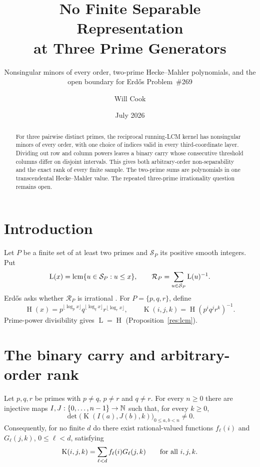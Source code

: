 \documentclass[11pt]{article}
\title{No Finite Separable Representation\\at Three Prime Generators}
\subtitle{Nonsingular minors of every order, two-prime Hecke--Mahler
polynomials, and the open boundary for Erd\H{o}s Problem~\#269}
\author{Will Cook}
\date{July 2026}
\newcommand{\hgt}{\operatorname{H}}
\newcommand{\Lprefix}{\operatorname{L}}
\newcommand{\Kernel}{\operatorname{K}}
\begin{document}
\maketitle
\noteprovenance

\begin{abstract}
For three pairwise distinct primes, the reciprocal running-LCM kernel has
nonsingular minors of every order, with one choice of indices valid in every
third-coordinate layer.  Dividing out row and column powers leaves a binary
carry whose consecutive threshold columns differ on disjoint intervals.
This gives both arbitrary-order non-separability and the exact rank of every
finite sample.  The two-prime sums are polynomials in one transcendental
Hecke--Mahler value.  The repeated three-prime irrationality question remains
open.
\end{abstract}

\section{Introduction}\label{sec:problem}
Let $P$ be a finite set of at least two primes and $\mathcal S_P$ its positive
smooth integers.  Put
\[
 \Lprefix(x)=\lcm\{u\in\mathcal S_P:u\le x\},\qquad
 \mathcal R_P=\sum_{u\in\mathcal S_P}\Lprefix(u)^{-1}.
\]
Erd\H{o}s asks whether $\mathcal R_P$ is irrational
\cite[p.~65]{erdosgraham1980}\cite[p.~106]{erdos1988}.
For $P=\{p,q,r\}$, define
\[
 \hgt(x)=p^{\lfloor\log_p x\rfloor}
 q^{\lfloor\log_q x\rfloor}r^{\lfloor\log_r x\rfloor},\qquad
 \Kernel(i,j,k)=\hgt(p^iq^jr^k)^{-1}.
\]
Prime-power divisibility gives $\Lprefix=\hgt$
(Proposition~\ref{res:lcm}).

\section{The binary carry and arbitrary-order rank}\label{sec:rank}

\begin{theorem}\label{res:infinite-rank}
Let $p,q,r$ be primes with $p\ne q$, $p\ne r$ and $q\ne r$.  For every
$n\ge0$ there are injective maps $I,J:\{0,\ldots,n-1\}\to\mathbb{N}$ such that, for
every $k\ge0$,
\[
 \det\bigl(\Kernel(I(a),J(b),k)\bigr)_{0\le a,b<n}\ne0.
\]
Consequently, for no finite $d$ do there exist rational-valued functions
$f_\ell(i)$ and $G_\ell(j,k)$, $0\le\ell<d$, satisfying
\[
 \Kernel(i,j,k)=\sum_{\ell<d}f_\ell(i)G_\ell(j,k)
 \qquad\hbox{for all }i,j,k.
\]
\end{theorem}
\end{document}
